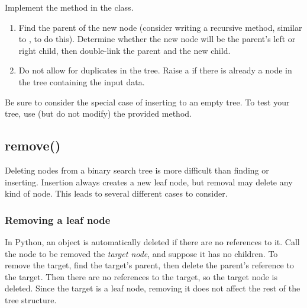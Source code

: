 \begin{comment}
\begin{lstlisting}
"""Pseudocode for finding the correct parent of a new node

find the parent of node, data
	if data < node.value:
		if node.left is not None 
			find the parent of node.left, data
		else:
			return node
	if data > node.right:
		if data > node.value:
			if node.right is not None:
				find the parent of node.right, data
			else:
				return node
"""
\end{lstlisting}
\end{comment}

\begin{problem}
Implement the  method in the  class.
\begin{enumerate}
\item Find the parent of the new node (consider writing a recursive method, similar to , to do this).
Determine whether the new node will be the parent's left or right child, then double-link the parent and the new child.
\item Do not allow for duplicates in the tree. Raise a  if there is already a node in the tree containing the input data.
\end{enumerate}
Be sure to consider the special case of inserting to an empty tree.
To test your tree, use (but do not modify) the provided  method.
\end{problem}

\subsection*{remove()}

Deleting nodes from a binary search tree is more difficult than finding or inserting.
Insertion always creates a new leaf node, but removal may delete any kind of node.
This leads to several different cases to consider.

\subsubsection*{Removing a leaf node}

In Python, an object is automatically deleted if there are no references to it.
Call the node to be removed the \emph{target node}, and suppose it has no children.
To remove the target, find the target's parent, then delete the parent's reference to the target.
Then there are no references to the target, so the target node is deleted.
Since the target is a leaf node, removing it does not affect the rest of the tree structure.

